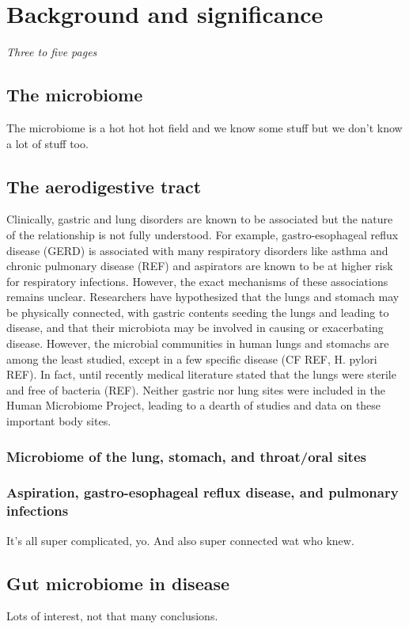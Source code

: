 \documentclass[12pt]{article}
\begin{document}
\section{Background and significance}
\textit{Three to five pages}

\subsection{The microbiome}
The microbiome is a hot hot hot field and we know some stuff but we don't know a lot of stuff too.

\subsection{The aerodigestive tract}
Clinically, gastric and lung disorders are known to be associated but the nature of the relationship is not fully understood. For example, gastro-esophageal reflux disease (GERD) is associated with many respiratory disorders like asthma and chronic pulmonary disease (REF) and aspirators are known to be at higher risk for respiratory infections. However, the exact mechanisms of these associations remains unclear. Researchers have hypothesized that the lungs and stomach may be physically connected, with gastric contents seeding the lungs and leading to disease, and that their microbiota may be involved in causing or exacerbating disease. However, the microbial communities in human lungs and stomachs are among the least studied, except in a few specific disease (CF REF, H. pylori REF). In fact, until recently medical literature stated that the lungs were sterile and free of bacteria (REF). Neither gastric nor lung sites were included in the Human Microbiome Project, leading to a dearth of studies and data on these important body sites.

\subsubsection{Microbiome of the lung, stomach, and throat/oral sites}

\subsubsection*{Aspiration, gastro-esophageal reflux disease, and pulmonary infections}
It's all super complicated, yo. And also super connected wat who knew.

\subsection*{Gut microbiome in disease}
Lots of interest, not that many conclusions.
\end{document}
